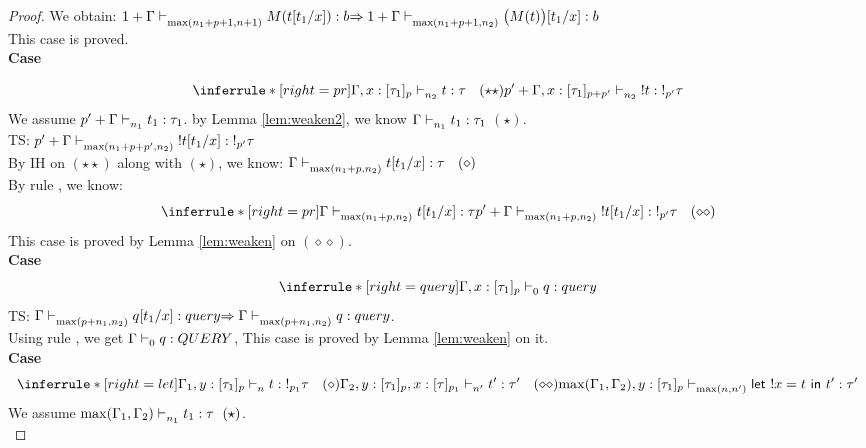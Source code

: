 \documentclass{article}
\begin{document}
\begin{proof}
   We obtain: $ 1 + \Gamma \mathrel{\vdash_{  \max(n_1+p+1, n+1) }^{} {M(t[t_1/x])} : {b}} \Rightarrow 
     1 + \Gamma \mathrel{\vdash_{  \max(n_1+p+1, n_2) }^{} {\big ( M(t) \big )[t_1/x]} : {b}} $\\
     This case is proved.\\
     
   \noindent \textbf{Case}
   
   \[
   \inferrule*[right = pr]
   {\Gamma, x:[\tau_1]_{p} \jtype{n_2}{}{t}{\tau} \ \ (\star\star)}
   {p' + \Gamma, x:[\tau_1]_{p+p'} \jtype{n_2}{}{!t}{!_{p'} \tau}  }
   \]
   We assume $p'+ \Gamma \mathrel{\vdash_{n_1}^{} {t_1} : {\tau_1}}$.
   by Lemma \ref{lem:weaken2}, we know $  \Gamma \mathrel{\vdash_{n_1}^{} {t_1} : {\tau_1}}$ $(\star)$.\\
   TS: $ p'+ \Gamma \mathrel{\vdash_{\max(n_1+p+p', n_2)}^{} {!t[t_1/x]} : {!_{p'} \tau }} $\\
   
   By IH on $(\star\star)$ along with $(\star)$, we know:
   $ \Gamma \mathrel{\vdash_{\max(n_1+p,n_2)}^{} {t[t_1/x]} : {\tau}} \ \ (\diamond)$\\
   By rule , we know: 
     \[
   \inferrule*[right = pr]
   {\Gamma \jtype{\max(n_1+p,n_2)}{}{t[t_1/x]}{\tau} }
   {p' + \Gamma \jtype{ \max(n_1+p,n_2) }{}{!t[t_1/x]}{!_{p'} \tau} \ \ (\diamond \diamond)  }
   \]
   This case is proved by Lemma \ref{lem:weaken} on $(\diamond\diamond)$. \\
  
  \noindent \textbf{Case}
   \[
     \inferrule*[right = query]
   {\empty}
   {\Gamma, x: [\tau_1]_p \jtype{0}{}{q}{query}  }
   \]   
   TS: $\Gamma \mathrel{\vdash_{\max(p+n_1, n_2)}^{} {q[t_1/x]} : {query}} \Rightarrow \Gamma \mathrel{\vdash_{\max(p+n_1, n_2)}^{} {q } : {query}} $.\\
   Using rule , we get $\Gamma \mathrel{\vdash_{0}^{} {q} : {QUERY}}$,
   This case is proved by Lemma \ref{lem:weaken} on it.\\
   
  \noindent \textbf{Case} 
   \[
    \inferrule*[ right = let ]
   {\Gamma_1, y : [\tau_1]_{p} \jtype{n}{}{t}{!_{p_1} \tau} \ \ (\diamond) \\ \Gamma_2, y : [\tau_1]_{p}, x: [\tau]_{p_1} \jtype{n'}{}{t'}{\tau'} \ \ (\diamond \diamond) }
   { \max(\Gamma_1,\Gamma_2 ), y : [\tau_1]_{p} \jtype{\max(n,n')}{}{\letx{!x}{t}{t'}}{\tau'}  }
   \]
   We assume $ \max(\Gamma_1,\Gamma_2) \jtype{n_1}{}{t_1}{\tau}~(\star)$.\\
   

\end{proof}
\end{document}
